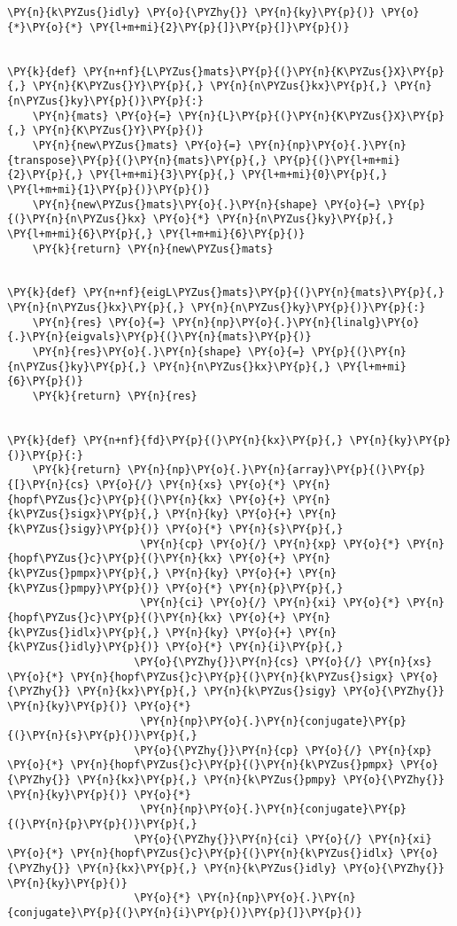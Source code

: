\begin{Verbatim}[commandchars=\\\{\}]
\PY{n}{k\PYZus{}idly} \PY{o}{\PYZhy{}} \PY{n}{ky}\PY{p}{)} \PY{o}{*}\PY{o}{*} \PY{l+m+mi}{2}\PY{p}{]}\PY{p}{]}\PY{p}{)}


\PY{k}{def} \PY{n+nf}{L\PYZus{}mats}\PY{p}{(}\PY{n}{K\PYZus{}X}\PY{p}{,} \PY{n}{K\PYZus{}Y}\PY{p}{,} \PY{n}{n\PYZus{}kx}\PY{p}{,} \PY{n}{n\PYZus{}ky}\PY{p}{)}\PY{p}{:}
    \PY{n}{mats} \PY{o}{=} \PY{n}{L}\PY{p}{(}\PY{n}{K\PYZus{}X}\PY{p}{,} \PY{n}{K\PYZus{}Y}\PY{p}{)}
    \PY{n}{new\PYZus{}mats} \PY{o}{=} \PY{n}{np}\PY{o}{.}\PY{n}{transpose}\PY{p}{(}\PY{n}{mats}\PY{p}{,} \PY{p}{(}\PY{l+m+mi}{2}\PY{p}{,} \PY{l+m+mi}{3}\PY{p}{,} \PY{l+m+mi}{0}\PY{p}{,} \PY{l+m+mi}{1}\PY{p}{)}\PY{p}{)}
    \PY{n}{new\PYZus{}mats}\PY{o}{.}\PY{n}{shape} \PY{o}{=} \PY{p}{(}\PY{n}{n\PYZus{}kx} \PY{o}{*} \PY{n}{n\PYZus{}ky}\PY{p}{,} \PY{l+m+mi}{6}\PY{p}{,} \PY{l+m+mi}{6}\PY{p}{)}
    \PY{k}{return} \PY{n}{new\PYZus{}mats}


\PY{k}{def} \PY{n+nf}{eigL\PYZus{}mats}\PY{p}{(}\PY{n}{mats}\PY{p}{,} \PY{n}{n\PYZus{}kx}\PY{p}{,} \PY{n}{n\PYZus{}ky}\PY{p}{)}\PY{p}{:}
    \PY{n}{res} \PY{o}{=} \PY{n}{np}\PY{o}{.}\PY{n}{linalg}\PY{o}{.}\PY{n}{eigvals}\PY{p}{(}\PY{n}{mats}\PY{p}{)}
    \PY{n}{res}\PY{o}{.}\PY{n}{shape} \PY{o}{=} \PY{p}{(}\PY{n}{n\PYZus{}ky}\PY{p}{,} \PY{n}{n\PYZus{}kx}\PY{p}{,} \PY{l+m+mi}{6}\PY{p}{)}
    \PY{k}{return} \PY{n}{res}


\PY{k}{def} \PY{n+nf}{fd}\PY{p}{(}\PY{n}{kx}\PY{p}{,} \PY{n}{ky}\PY{p}{)}\PY{p}{:}
    \PY{k}{return} \PY{n}{np}\PY{o}{.}\PY{n}{array}\PY{p}{(}\PY{p}{[}\PY{n}{cs} \PY{o}{/} \PY{n}{xs} \PY{o}{*} \PY{n}{hopf\PYZus{}c}\PY{p}{(}\PY{n}{kx} \PY{o}{+} \PY{n}{k\PYZus{}sigx}\PY{p}{,} \PY{n}{ky} \PY{o}{+} \PY{n}{k\PYZus{}sigy}\PY{p}{)} \PY{o}{*} \PY{n}{s}\PY{p}{,}
                     \PY{n}{cp} \PY{o}{/} \PY{n}{xp} \PY{o}{*} \PY{n}{hopf\PYZus{}c}\PY{p}{(}\PY{n}{kx} \PY{o}{+} \PY{n}{k\PYZus{}pmpx}\PY{p}{,} \PY{n}{ky} \PY{o}{+} \PY{n}{k\PYZus{}pmpy}\PY{p}{)} \PY{o}{*} \PY{n}{p}\PY{p}{,}
                     \PY{n}{ci} \PY{o}{/} \PY{n}{xi} \PY{o}{*} \PY{n}{hopf\PYZus{}c}\PY{p}{(}\PY{n}{kx} \PY{o}{+} \PY{n}{k\PYZus{}idlx}\PY{p}{,} \PY{n}{ky} \PY{o}{+} \PY{n}{k\PYZus{}idly}\PY{p}{)} \PY{o}{*} \PY{n}{i}\PY{p}{,}
                    \PY{o}{\PYZhy{}}\PY{n}{cs} \PY{o}{/} \PY{n}{xs} \PY{o}{*} \PY{n}{hopf\PYZus{}c}\PY{p}{(}\PY{n}{k\PYZus{}sigx} \PY{o}{\PYZhy{}} \PY{n}{kx}\PY{p}{,} \PY{n}{k\PYZus{}sigy} \PY{o}{\PYZhy{}} \PY{n}{ky}\PY{p}{)} \PY{o}{*}
                     \PY{n}{np}\PY{o}{.}\PY{n}{conjugate}\PY{p}{(}\PY{n}{s}\PY{p}{)}\PY{p}{,}
                    \PY{o}{\PYZhy{}}\PY{n}{cp} \PY{o}{/} \PY{n}{xp} \PY{o}{*} \PY{n}{hopf\PYZus{}c}\PY{p}{(}\PY{n}{k\PYZus{}pmpx} \PY{o}{\PYZhy{}} \PY{n}{kx}\PY{p}{,} \PY{n}{k\PYZus{}pmpy} \PY{o}{\PYZhy{}} \PY{n}{ky}\PY{p}{)} \PY{o}{*}
                     \PY{n}{np}\PY{o}{.}\PY{n}{conjugate}\PY{p}{(}\PY{n}{p}\PY{p}{)}\PY{p}{,}
                    \PY{o}{\PYZhy{}}\PY{n}{ci} \PY{o}{/} \PY{n}{xi} \PY{o}{*} \PY{n}{hopf\PYZus{}c}\PY{p}{(}\PY{n}{k\PYZus{}idlx} \PY{o}{\PYZhy{}} \PY{n}{kx}\PY{p}{,} \PY{n}{k\PYZus{}idly} \PY{o}{\PYZhy{}} \PY{n}{ky}\PY{p}{)}
                    \PY{o}{*} \PY{n}{np}\PY{o}{.}\PY{n}{conjugate}\PY{p}{(}\PY{n}{i}\PY{p}{)}\PY{p}{]}\PY{p}{)}



\end{Verbatim}
